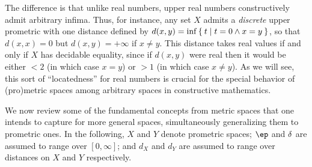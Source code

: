 \documentclass{article}
\def\Rp{[0,\infty]}
\begin{document}
The difference is that unlike real numbers, upper real numbers constructively admit arbitrary infima.
Thus, for instance, any set $X$ admits a \emph{discrete} upper prometric with one distance defined by $d(x,y) = \inf \Set{ t | t=0 \land x=y }$, so that $d(x,x)=0$ but $d(x,y)=+\infty$ if $x\neq y$.
This distance takes real values if and only if $X$ has decidable equality, since if $d(x,y)$ were real then it would be either $<2$ (in which case $x=y$) or $>1$ (in which case $x\neq y$).
As we will see, this sort of ``locatedness'' for real numbers is crucial for the special behavior of (pro)metric spaces among arbitrary spaces in constructive mathematics.

We now review some of the fundamental concepts from metric spaces that one intends to capture for more general spaces, simultaneously generalizing them to prometric ones.
In the following, $X$ and $Y$ denote prometric spaces; $\ep$ and $\delta$ are assumed to range over $\Rp$; and $d_X$ and $d_Y$ are assumed to range over distances on $X$ and $Y$ respectively.
\end{document}
